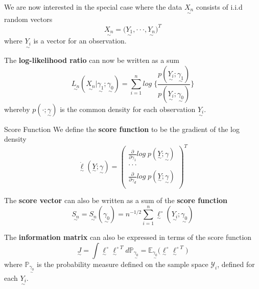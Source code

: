 \documentclass[twoside]{article}
\newcommand{\prob}{\mathbb{P}}
\newcommand{\utilde}{\underset{\sim}}
\begin{document}
We are now interested in the special case where the data $\utilde{X_{n}}$ consists of i.i.d random vectors 
\begin{equation}
\utilde{X_{n}} = \big(\utilde{Y_{1}}, \cdot \cdot \cdot , \utilde{Y_{n}} \big)^{T}
\end{equation}
where $\utilde{Y_{i}}$ is a vector for an observation.

The \textbf{log-likelihood ratio} can now be written as a sum 
\begin{equation}
\utilde{L_{n}}(\utilde{X_{n}}| \utilde{\gamma_{1}}; \utilde{\gamma_{0}}) = \sum_{i=1}^{n}log\;\bigg\{\frac{p(\utilde{Y_{i}}; \utilde{\gamma_{1}})}{p(\utilde{Y_{i}}; \utilde{\gamma_{0}})} \bigg\}
\end{equation}
whereby $p(\cdot; \utilde{\gamma})$ is the common density for each observation $\utilde{Y_{i}}.$


\begin{definition_exam}{Score Function}{} We define the \textbf{score function} to be the gradient of the log density
\begin{equation}
\dot{\utilde{\ell}}(\utilde{Y}; \utilde{\gamma}) = 
\begin{pmatrix}
\frac{\partial}{\partial \gamma_{1}}log\;p(\utilde{Y}; \utilde{\gamma})\\
\cdot \cdot \cdot \\
\frac{\partial}{\partial \gamma_{d}}log\;p(\utilde{Y}; \utilde{\gamma})\\
\end{pmatrix}^{T}
\end{equation}
\end{definition_exam}


The \textbf{score vector} can also be written as a sum of the \textbf{score function}
\begin{equation}
\utilde{S_{n}} = \utilde{S_{n}}(\utilde{\gamma_{0}}) = n^{-1/2}\sum_{i=1}^{n}\utilde{\ell}^{\circ}(\utilde{Y_{i}}; \utilde{\gamma_{0}})
\end{equation}

The \textbf{information matrix} can also be expressed in terms of the score function 
\begin{equation}
\utilde{J} = \int \utilde{\ell}^{\circ} \utilde{\ell}^{\circ \; T} d\prob_{\utilde{\gamma_{0}}} = \mathbb{E}_{\utilde{\gamma_{0}}}\big(\utilde{\ell}^{\circ} \utilde{\ell}^{\circ \; T} \big)
\end{equation}
where $\prob_{\utilde{\gamma_{0}}}$ is the probability measure defined on the sample space $\mathcal{Y}_i$, defined for each $\utilde{Y_{i}}.$
\end{document}
